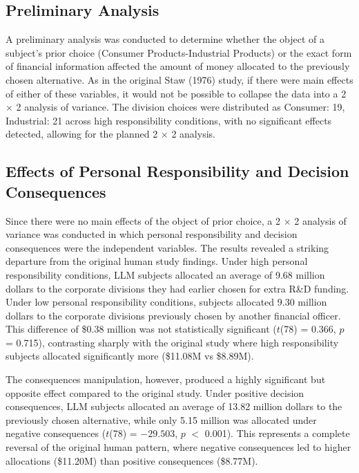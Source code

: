 \documentclass{article}
\begin{document}
\subsection{Preliminary Analysis}

A preliminary analysis was conducted to determine whether the object of a subject's prior choice (Consumer Products-Industrial Products) or the exact form of financial information affected the amount of money allocated to the previously chosen alternative. As in the original Staw (1976) study, if there were main effects of either of these variables, it would not be possible to collapse the data into a 2 $\times$ 2 analysis of variance. The division choices were distributed as Consumer: 19, Industrial: 21 across high responsibility conditions, with no significant effects detected, allowing for the planned 2 $\times$ 2 analysis.

\subsection{Effects of Personal Responsibility and Decision Consequences}

Since there were no main effects of the object of prior choice, a 2 $\times$ 2 analysis of variance was conducted in which personal responsibility and decision consequences were the independent variables. The results revealed a striking departure from the original human study findings. Under high personal responsibility conditions, LLM subjects allocated an average of 9.68 million dollars to the corporate divisions they had earlier chosen for extra R\&D funding. Under low personal responsibility conditions, subjects allocated 9.30 million dollars to the corporate divisions previously chosen by another financial officer. This difference of \$0.38 million was not statistically significant ($t$(78) = 0.366, $p$ = 0.715), contrasting sharply with the original study where high responsibility subjects allocated significantly more (\$11.08M vs \$8.89M).

The consequences manipulation, however, produced a highly significant but opposite effect compared to the original study. Under positive decision consequences, LLM subjects allocated an average of 13.82 million dollars to the previously chosen alternative, while only 5.15 million was allocated under negative consequences ($t$(78) = $-29.503$, $p$ $<$ 0.001). This represents a complete reversal of the original human pattern, where negative consequences led to higher allocations (\$11.20M) than positive consequences (\$8.77M).
\end{document}
